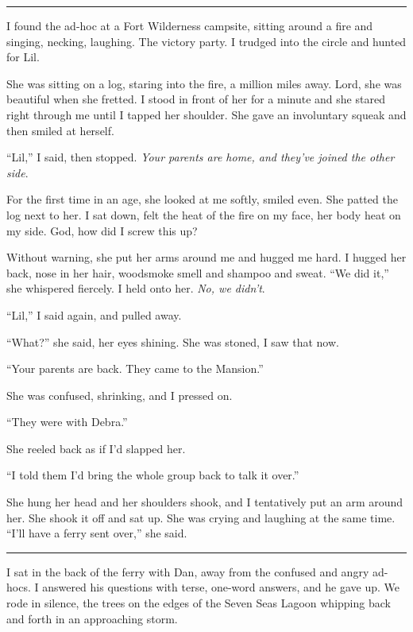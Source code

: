 \begin{center}\rule{1in}{0.4pt}\end{center}

I found the ad-hoc at a Fort Wilderness campsite, sitting around a
fire and singing, necking, laughing. The victory party. I trudged
into the circle and hunted for Lil.

She was sitting on a log, staring into the fire, a million miles
away. Lord, she was beautiful when she fretted. I stood in front of
her for a minute and she stared right through me until I tapped her
shoulder. She gave an involuntary squeak and then smiled at
herself.

“Lil,” I said, then stopped.
\emph{Your parents are home, and they've joined the other side}.

For the first time in an age, she looked at me softly, smiled even.
She patted the log next to her. I sat down, felt the heat of the
fire on my face, her body heat on my side. God, how did I screw
this up?

Without warning, she put her arms around me and hugged me hard. I
hugged her back, nose in her hair, woodsmoke smell and shampoo and
sweat. “We did it,” she whispered fiercely. I held onto her.
\emph{No, we didn't}.

“Lil,” I said again, and pulled away.

“What?” she said, her eyes shining. She was stoned, I saw that
now.

“Your parents are back. They came to the Mansion.”

She was confused, shrinking, and I pressed on.

“They were with Debra.”

She reeled back as if I'd slapped her.

“I told them I'd bring the whole group back to talk it over.”

She hung her head and her shoulders shook, and I tentatively put an
arm around her. She shook it off and sat up. She was crying and
laughing at the same time. “I'll have a ferry sent over,” she
said.

\begin{center}\rule{1in}{0.4pt}\end{center}

I sat in the back of the ferry with Dan, away from the confused and
angry ad-hocs. I answered his questions with terse, one-word
answers, and he gave up. We rode in silence, the trees on the edges
of the Seven Seas Lagoon whipping back and forth in an approaching
storm.

